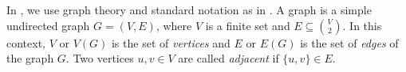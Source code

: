 \documentclass[11pt]{article}
\newcommand{\bu}{\mathbf{u}}
\newcommand{\R}{\mathbb{R}}
\newcommand{\Z}{\mathbb{Z}}
\newcommand{\N}{\mathbb{N}}
\DeclareMathOperator{\ldiam}{diam_\Z}
\begin{document}
In , we use graph theory and standard notation as in \cite{bondy2008graph}. A graph is a simple undirected graph $G=(V,E)$, where $V$ is a finite set and $E \subseteq \binom{V}{2}$. In this context, $V$ or $V(G)$ is the set of \emph{vertices} and $E$ or $E(G)$ is the set of \emph{edges} of the graph $G$. Two vertices $u,v\in V$ are called \emph{adjacent} if $\{u,v\} \in E$.



\end{document}
